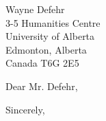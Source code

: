 \documentclass[letterpaper]{letter}
\begin{document}
\begin{letter}
{
Wayne Defehr\\
3-5 Humanities Centre\\
University of Alberta\\
Edmonton, Alberta\\
Canada T6G 2E5\\
}

\opening{Dear Mr. Defehr,}
\doublespacing
\lipsum[1]

\lipsum[2]

\lipsum[3]
\closing{Sincerely,}

\end{letter}
\end{document}
